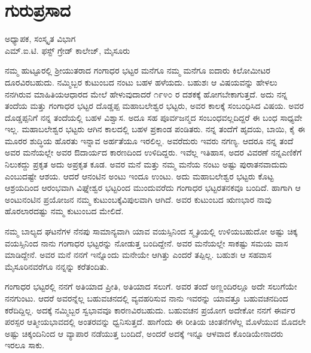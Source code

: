 {\fontsize{14}{16}\selectfont
\chapter{ಗುರುಪ್ರಸಾದ}

\begin{center}
\smallskip

ಅಧ್ಯಾಪಕ, ಸಂಸ್ಕೃತ ವಿಭಾಗ\\
ಎಮ್.ಐ.ಟಿ. ಫಸ್ಟ್ ಗ್ರೇಡ್ ಕಾಲೇಜ್, ಮೈಸೂರು
\addrule
\end{center}

ನಮ್ಮ ಹುಟ್ಟೂರಲ್ಲಿ ಶ್ರೀಯುತರಾದ ಗಂಗಾಧರ ಭಟ್ಟರ ಮನೆಗೂ ನಮ್ಮ ಮನೆಗೂ ಐದಾರು ಕಿಲೋಮೀಟರ ದೂರವಿರಬಹುದು. ನಮ್ಮಿಬ್ಬರ ಕುಟುಂಬದ ನಂಟು ಬಹಳ ಹಳೆಯದು. ಬಹುಶಃ ಆ  ವಿಷಯವನ್ನು ಹೇಳಲು ನನಗಿರುವ ಮಾಹಿತಿಯ\break ಆಧಾರದ ಮೇಲೆ ಹೇಳುವುದಾದರೆ ೧೯೪೦ ರ ದಶಕಕ್ಕೆ ಹೋಗಬೇಕಾಗುತ್ತದೆ. ಅದು ನನ್ನ ತಂದೆಯ ಮತ್ತು ಗಂಗಾಧರ ಭಟ್ಟರ ದೊಡ್ಡಪ್ಪ \enginline{-} ಮಹಾ\-ಬಲೇಶ್ವರ ಭಟ್ಟರು, ಅವರ ಕಾಲಕ್ಕೆ ಸಂಬಂಧಿಸಿದ ವಿಷಯ. ಅವರ ದೊಡ್ಡಪ್ಪನಿಗೆ ನನ್ನ ತಂದೆಯಲ್ಲಿ ಬಹಳ ವಿಶ್ವಾಸ. ಅದೂ ಸಹ ಪೂರ್ವಜನ್ಮದ ಸಂಬಂಧವಲ್ಲದಿದ್ದರೆ ಈ ಬಂಧ ಸಾಧ್ಯವೇ ಇಲ್ಲ. ಮಹಾ\-ಬಲೇಶ್ವರ ಭಟ್ಟರು ಆಗಿನ ಕಾಲದಲ್ಲಿ ಬಹಳ ಪ್ರಕಾಂಡ ಪಂಡಿತರು. ನನ್ನ ತಂದೆಗೆ ಹೃದಯ, ಬಾಯಿ, ಕೈ ಈ ಮೂರರ ಶುದ್ಧಿಯ ಹೊರತು ಇನ್ನಾವ ಅರ್ಹತೆಯೂ ಇರಲಿಲ್ಲ. ಅವರೆದುರು ಇವರು ನಗಣ್ಯ. ಆದರೂ ನನ್ನ ತಂದೆ ಅವರ ಮನೆಯಲ್ಲೇ ಅವರ ಔದಾರ್ಯದ ಕಾರಣದಿಂದ ಉಳಿದಿದ್ದರು. ಇವೆಲ್ಲ  ಇತಿಹಾಸ, ಅದರ ವಿವರಣೆ ನನ್ನ\break ಎಣಿಕೆಗೆ ನಿಲುಕದ್ದು \enginline{-} ಪ್ರಕೃತ ಅದು ಅಪ್ರಕೃತ ಕೂಡ. ಅವರ ಮನೆ ಮತ್ತು ನಮ್ಮ ಮನೆಯ ನಂಟು ಅಷ್ಟು ಪುರಾತನವಾದುದು ಎಂಬುದಷ್ಟೇ ಆಶಯ. ಆದರೆ ಆ\break ನಂಟಿನ ಅಂಟು ಇಂದೂ ಉಂಟು. ಅದು ಮಹಾಬಲೇಶ್ವರ ಭಟ್ಟರು ಕೊಟ್ಟ ಆಶ್ರಯ\-ದಿಂದ ಆರಂಭವಾಗಿ ವಿಘ್ನೇಶ್ವರ ಭಟ್ಟರಿಂದ ಮುಂದುವರೆದು ಗಂಗಾಧರ ಭಟ್ಟರ\break ತನಕವೂ ಬಂದಿದೆ. ಹಾಗಾಗಿ ಆ ಅಂಟು\enginline{-}ನಂಟಿನ ಪ್ರಯೋಜನ ನಮ್ಮ ಕುಟುಂಬಕ್ಕೆ\break ವಿಪುಲವಾಗಿ ಆಗಿದೆ. ಅವರ ಕುಟುಂಬದ ಋಣಭಾರ ನಾವು ಹೊರಲಾರದಷ್ಟು ನಮ್ಮ ಕುಟುಂಬದ ಮೇಲಿದೆ.

ನಮ್ಮ ಬಾಲ್ಯದ ಘಟನೆಗಳ ನೆನಪು ಸಾಮಾನ್ಯವಾಗಿ ಯಾವ ವಯಸ್ಸಿನಿಂದ ಸ್ಮೃತಿಯಲ್ಲಿ ಉಳಿಯಬಹುದೋ ಅಷ್ಟು ಚಿಕ್ಕ ವಯಸ್ಸಿನಿಂದ ನಾನು ಗಂಗಾಧರ ಭಟ್ಟರನ್ನು ನೋಡುತ್ತ ಬಂದಿದ್ದೇನೆ. ಅವರ ಮನೆಯಲ್ಲೇ ಸಾಕಷ್ಟು ಸಮಯ ವಾಸ ಮಾಡಿದ್ದೇನೆ. ಅವರ ಮನೆ ನನಗೆ ಇನ್ನೊಂದು ಮನೇಯೇ ಆಗಿತ್ತು ಎಂದರೆ ತಪ್ಪಿಲ್ಲ. ಬಹುಶಃ ಆ ಸಹವಾಸ ಮೈಸೂರಿನವರೆಗೂ ನನ್ನನ್ನು ಕರೆತಂದಿತು.

ಗಂಗಾಧರ ಭಟ್ಟರಲ್ಲಿ ನನಗೆ ಅತಿಯಾದ ಪ್ರೀತಿ, ಅತಿಯಾದ ಸಲುಗೆ. ಅವರ ತಂದೆ ಅಣ್ಣಂದಿರಲ್ಲೂ ಅದೇ ಸಲುಗೆಯೇ ನನಗುಂಟು. ಆದರೆ ಅವರನ್ನೆಲ್ಲ ಬಹುವಚನದಲ್ಲಿ ವ್ಯವಹರಿಸುವ ನಾನು ಇವರನ್ನು ಯಾವತ್ತೂ ಬಹುವಚನದಿಂದ ಕರೆದಿದ್ದಿಲ್ಲ. ಅದಕ್ಕೆ ನಮ್ಮಿಬ್ಬರ ಸ್ವಭಾವವೂ ಕಾರಣವಿರಬಹುದು. ಬಹುವಚನ ಪ್ರಯೋಗ ಅದೇಕೋ ನನಗೆ ಈರ್ವರ ಪರಸ್ಪರ ಆತ್ಮೀಯಭಾವದಲ್ಲಿ ಅಂತರವನ್ನು ಧ್ವನಿಸುತ್ತದೆ. ಹಾಗೆಂದು ಈ ರೀತಿಯ ಚಿಂತನೆಗಳೆಲ್ಲ ಮೊಳೆಯುವ ಮೊದಲೇ \enginline{-} ಅಷ್ಟು ಚಿಕ್ಕಂದಿನಿಂದ ಆ ವ್ಯಾಪಾರ ನಡೆಯುತ್ತ ಬಂದಿದೆ, ಅಂದರೆ ಅದಕ್ಕೆ ಇನ್ನೂ ಆಳವಾದ ಕೊಂಡಿಯೇನಾದರು ಇರಲೂ ಸಾಕು.

}
